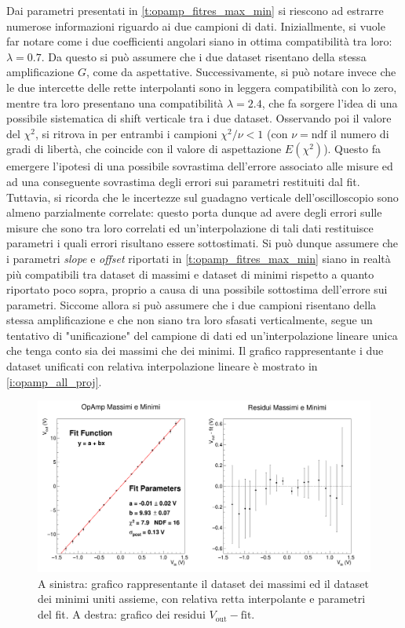 \documentclass[a4paper,11pt]{article} %
\begin{document}
\noindent Dai parametri presentati in  \autoref{t:opamp_fitres_max_min} si riescono ad estrarre numerose informazioni
riguardo ai due campioni di dati. Iniziallmente, si vuole far notare come i due coefficienti angolari siano in ottima
compatibilità tra loro: $\lambda=0.7$. Da questo si può assumere che i due dataset risentano della stessa amplificazione
$G$, come da aspettative. Successivamente, si può notare invece che le due intercette delle rette interpolanti sono in
leggera compatibilità con lo zero, mentre tra loro presentano una compatibilità $\lambda=2.4$, che fa sorgere l'idea di
una possibile sistematica di shift verticale tra i due dataset. Osservando poi il valore del $\chi^2$, si ritrova in per
entrambi i campioni $\chi^2/\nu<1$ (con $\nu=\text{ndf}$ il numero di gradi di libertà, che coincide con il valore di
aspettazione $E(\chi^2)$). Questo fa emergere l'ipotesi di una possibile sovrastima dell'errore associato alle misure ed
ad una conseguente sovrastima degli errori sui parametri restituiti dal fit. Tuttavia, si ricorda che le incertezze sul
guadagno verticale dell'oscilloscopio sono almeno parzialmente correlate: questo porta dunque ad avere degli errori
sulle misure che sono tra loro correlati ed un'interpolazione di tali dati restituisce parametri i quali errori
risultano essere sottostimati. Si può dunque assumere che i parametri \textit{slope} e \textit{offset} riportati in
 \autoref{t:opamp_fitres_max_min} siano in realtà più compatibili tra dataset di massimi e dataset di minimi rispetto
a quanto riportato poco sopra, proprio a causa di una possibile sottostima dell'errore sui parametri. Siccome allora si
può assumere che i due campioni risentano della stessa amplificazione e che non siano tra loro sfasati verticalmente,
segue un tentativo di "unificazione" del campione di dati ed un'interpolazione lineare unica che tenga conto sia dei
massimi che dei minimi. Il grafico rappresentante i due dataset unificati con relativa interpolazione lineare è mostrato
in  \autoref{i:opamp_all_proj}. 

\begin{figure}[H]
	\centering
	\includegraphics[width=\linewidth]{../Plots/Report_Plots/opamp_plot_all_projected.png}
	\caption{A sinistra: grafico rappresentante il dataset dei massimi ed il dataset dei minimi uniti assieme, 
	con relativa retta interpolante e parametri del fit. A destra: grafico dei residui $V_{\text{out}}-\text{fit}$.}
	\label{i:opamp_all_proj}
\end{figure}
\end{document}
